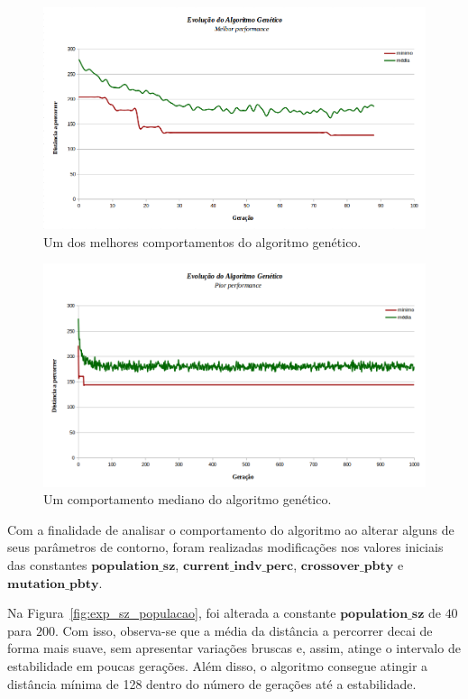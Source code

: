 \begin{figure}[!h]
    \centering
    \includegraphics[width=\linewidth]{Imagens/best_perfomance.png}
    \caption{Um dos melhores comportamentos do algoritmo genético.}
    \label{fig:exp_best}
\end{figure}

\begin{figure}[!h]
    \centering
    \includegraphics[width=\linewidth]{Imagens/worst_performance.png}
    \caption{Um comportamento mediano do algoritmo genético.}
    \label{fig:exp_worst}
\end{figure}


Com a finalidade de analisar o comportamento do algoritmo ao alterar alguns de seus parâmetros de contorno, foram realizadas modificações nos valores iniciais das constantes $\mathbf{population\_sz}$, $\mathbf{current\_indv\_perc}$, $\mathbf{crossover\_pbty}$ e $\mathbf{mutation\_pbty}$.

Na Figura~\ref{fig:exp_sz_populacao}, foi alterada a constante $\mathbf{population\_sz}$ de $40$ para $200$. Com isso, observa-se que a média da distância a percorrer decai de forma mais suave, sem apresentar variações bruscas e, assim, atinge o intervalo de estabilidade em poucas gerações. Além disso, o algoritmo consegue atingir a distância mínima de 128 dentro do número de gerações até a estabilidade.

